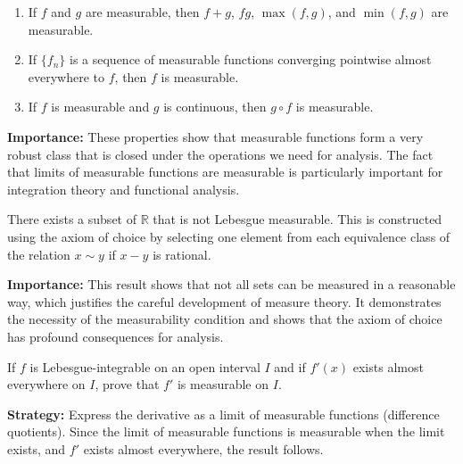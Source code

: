 \begin{theorem}
\begin{enumerate}[label=(\alph*)]
\item If $f$ and $g$ are measurable, then $f + g$, $fg$, $\max(f, g)$, and $\min(f, g)$ are measurable.
\item If $\{f_n\}$ is a sequence of measurable functions converging pointwise almost everywhere to $f$, then $f$ is measurable.
\item If $f$ is measurable and $g$ is continuous, then $g \circ f$ is measurable.
\end{enumerate}
\end{theorem}

\noindent\textbf{Importance:} These properties show that measurable functions form a very robust class that is closed under the operations we need for analysis. The fact that limits of measurable functions are measurable is particularly important for integration theory and functional analysis.



\begin{theorem}
There exists a subset of $\mathbb{R}$ that is not Lebesgue measurable. This is constructed using the axiom of choice by selecting one element from each equivalence class of the relation $x \sim y$ if $x - y$ is rational.
\end{theorem}

\noindent\textbf{Importance:} This result shows that not all sets can be measured in a reasonable way, which justifies the careful development of measure theory. It demonstrates the necessity of the measurability condition and shows that the axiom of choice has profound consequences for analysis.





\begin{problembox}
\begin{problemstatement}
If $f$ is Lebesgue-integrable on an open interval $I$ and if $f'(x)$ exists almost everywhere on $I$, prove that $f'$ is measurable on $I$.
\end{problemstatement}
\end{problembox}

\noindent\textbf{Strategy:} Express the derivative as a limit of measurable functions (difference quotients). Since the limit of measurable functions is measurable when the limit exists, and $f'$ exists almost everywhere, the result follows.

